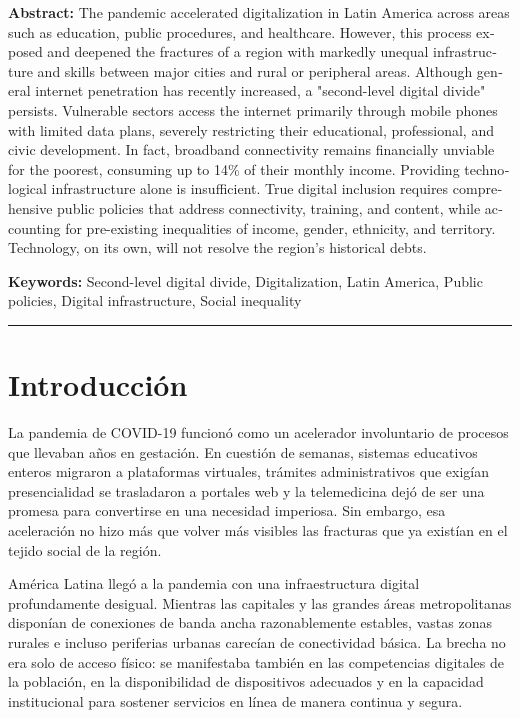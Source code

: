 \documentclass{article}
\begin{document}
\begin{tcolorbox}[colback=brown!8!white,colframe=brown!8!white,boxrule=0pt,arc=2pt,left=4pt,right=4pt,top=3pt,bottom=3pt,before skip=4pt,after skip=4pt]
\begin{otherlanguage}{english}
\sffamily\small \textbf{Abstract:} The pandemic accelerated digitalization in Latin America across areas such as education, public procedures, and healthcare. However, this process exposed and deepened the fractures of a region with markedly unequal infrastructure and skills between major cities and rural or peripheral areas.
Although general internet penetration has recently increased, a "second-level digital divide" persists. Vulnerable sectors access the internet primarily through mobile phones with limited data plans, severely restricting their educational, professional, and civic development. In fact, broadband connectivity remains financially unviable for the poorest, consuming up to 14\% of their monthly income.
Providing technological infrastructure alone is insufficient. True digital inclusion requires comprehensive public policies that address connectivity, training, and content, while accounting for pre-existing inequalities of income, gender, ethnicity, and territory. Technology, on its own, will not resolve the region's historical debts.
\par\smallskip\noindent\textbf{Keywords:} Second-level digital divide, Digitalization, Latin America, Public policies, Digital infrastructure, Social inequality
\end{otherlanguage}
\end{tcolorbox}

\bigskip
\noindent\rule{\linewidth}{0.4pt}
\bigskip

\section{Introducción}
La pandemia de COVID-19 funcionó como un acelerador involuntario de procesos que llevaban años en gestación. En cuestión de semanas, sistemas educativos enteros migraron a plataformas virtuales, trámites administrativos que exigían presencialidad se trasladaron a portales web y la telemedicina dejó de ser una promesa para convertirse en una necesidad imperiosa. Sin embargo, esa aceleración no hizo más que volver más visibles las fracturas que ya existían en el tejido social de la región.

América Latina llegó a la pandemia con una infraestructura digital profundamente desigual. Mientras las capitales y las grandes áreas metropolitanas disponían de conexiones de banda ancha razonablemente estables, vastas zonas rurales e incluso periferias urbanas carecían de conectividad básica. La brecha no era solo de acceso físico: se manifestaba también en las competencias digitales de la población, en la disponibilidad de dispositivos adecuados y en la capacidad institucional para sostener servicios en línea de manera continua y segura.
\end{document}
